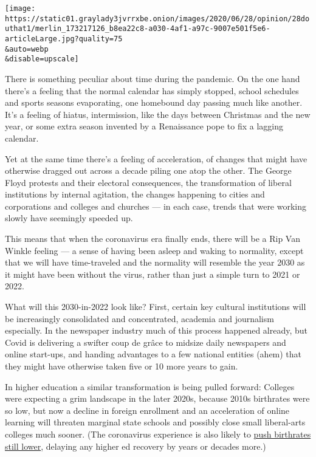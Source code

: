 \texttt{[image: https://static01.graylady3jvrrxbe.onion/images/2020/06/28/opinion/28douthat1/merlin\_173217126\_b8ea22c8-a030-4af1-a97c-9007e501f5e6-articleLarge.jpg?quality=75\\\&auto=webp\\\&disable=upscale]}

There is something peculiar about time during the pandemic. On the one
hand there's a feeling that the normal calendar has simply stopped,
school schedules and sports seasons evaporating, one homebound day
passing much like another. It's a feeling of hiatus, intermission, like
the days between Christmas and the new year, or some extra season
invented by a Renaissance pope to fix a lagging calendar.

Yet at the same time there's a feeling of acceleration, of changes that
might have otherwise dragged out across a decade piling one atop the
other. The George Floyd protests and their electoral consequences, the
transformation of liberal institutions by internal agitation, the
changes happening to cities and corporations and colleges and churches
--- in each case, trends that were working slowly have seemingly speeded
up.

This means that when the coronavirus era finally ends, there will be a
Rip Van Winkle feeling --- a sense of having been asleep and waking to
normality, except that we will have time-traveled and the normality will
resemble the year 2030 as it might have been without the virus, rather
than just a simple turn to 2021 or 2022.

What will this 2030-in-2022 look like? First, certain key cultural
institutions will be increasingly consolidated and concentrated,
academia and journalism especially. In the newspaper industry much of
this process happened already, but Covid is delivering a swifter coup de
grâce to midsize daily newspapers and online start-ups, and handing
advantages to a few national entities (ahem) that they might have
otherwise taken five or 10 more years to gain.

In higher education a similar transformation is being pulled forward:
Colleges were expecting a grim landscape in the later 2020s, because
2010s birthrates were so low, but now a decline in foreign enrollment
and an acceleration of online learning will threaten marginal state
schools and possibly close small liberal-arts colleges much sooner. (The
coronavirus experience is also likely to
\href{https://www.brookings.edu/research/half-a-million-fewer-children-the-coming-covid-baby-bust/}{push
birthrates still lower}, delaying any higher ed recovery by years or
decades more.)

